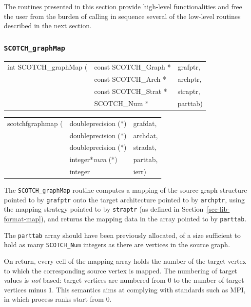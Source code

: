 The routines presented in this section provide high-level
functionalities and free the user from the burden of calling in
sequence several of the low-level routines described in the next
section.

\subsubsection{{\tt SCOTCH\_graphMap}}
\label{sec-lib-func-graphmap}

\begin{itemize}
\progsyn

{\tt\begin{tabular}{l@{}ll}
int SCOTCH\_graphMap ( & const SCOTCH\_Graph * & grafptr, \\
                       & const SCOTCH\_Arch *  & archptr, \\
                       & const SCOTCH\_Strat * & straptr, \\
                       & SCOTCH\_Num *         & parttab)
\end{tabular}}

{\tt\begin{tabular}{l@{}ll}
scotchfgraphmap ( & doubleprecision (*)   & grafdat, \\
                  & doubleprecision (*)   & archdat, \\
                  & doubleprecision (*)   & stradat, \\
                  & integer*{\it num} (*) & parttab, \\
                  & integer               & ierr)
\end{tabular}}

\progdes

The {\tt SCOTCH\_graphMap} routine computes a mapping of the source
graph structure pointed to by {\tt grafptr} onto the target
architecture pointed to by {\tt archptr}, using the mapping strategy
pointed to by {\tt straptr} (as defined in
Section~\ref{sec-lib-format-map}), and returns the mapping data in the
array pointed to by {\tt parttab}.

The {\tt parttab} array should have been previously allocated, of a
size sufficient to hold as many {\tt SCOTCH\_\lbt Num} integers as
there are vertices in the source graph.

On return, every cell of the mapping array holds the number of the
target vertex to which the corresponding source vertex is mapped.
The numbering of target values is {\em not\/} based: target vertices
are numbered from $0$ to the number of target vertices minus $1$.
This semantics aims at complying with standards such as MPI, in
which process ranks start from $0$.


\end{itemize}
